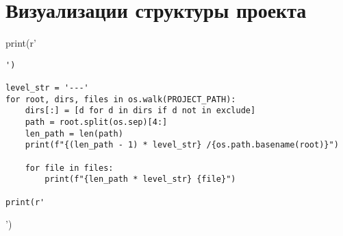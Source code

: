\section{Визуализации структуры проекта}
\begin{pycode}
print(r'\begin{verbatim}')

level_str = '---'
for root, dirs, files in os.walk(PROJECT_PATH):
    dirs[:] = [d for d in dirs if d not in exclude]
    path = root.split(os.sep)[4:]
    len_path = len(path)
    print(f"{(len_path - 1) * level_str} /{os.path.basename(root)}")

    for file in files:
        print(f"{len_path * level_str} {file}")

print(r'\end{verbatim}')
\end{pycode}

\clearpage